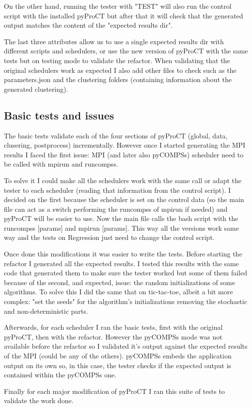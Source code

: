 On the other hand, running the tester with "TEST" will also run the control script with the installed pyProCT but after that it will check that the generated output matches the content of the "expected results dir".

The last three attributes allow us to use a single expected results dir with different scripts and schedulers, or use the new version of pyProCT with the same tests but on testing mode to validate the refactor. When validating that the original schedulers work as expected I also add other files to check such as the parameters.json and the clustering folders (containing information about the generated clustering).

\subsection{Basic tests and issues}

The basic tests validate each of the four sections of pyProCT (global, data, clusering, postprocess) incrementally. However once I started generating the MPI results I faced the first issue: MPI (and later also pyCOMPSs) scheduler need to be called with mpirun and runcompss. 

To solve it I could make all the schedulers work with the same call or adapt the tester to each scheduler (reading that information from the control script). I decided on the first because the scheduler is set on the control data (so the main file can act as a switch performing the runcompss of mpirun if needed) and pyProCT will be easier to use. Now the main file calls the bash script with the runcompss [params] and mpirun [params]. This way all the versions work same way and the tests on Regression just need to change the control script.

Once done this modifications it was easier to write the tests. Before starting the refactor I generated all the expected results. I tested this results with the same code that generated them to make sure the tester worked but some of them failed because of the second, and expected, issue: the random initializations of some algorithms. To solve this I did the same that on tic-tac-toe, albeit a bit more complex: "set the seeds" for the algorithm's initializations removing the stochastic and non-deterministic parts.


Afterwards, for each scheduler I ran the basic tests, first with the original pyProCT, then with the refactor. However the pyCOMPSs mode was not available before the refactor so I validated it's output against the expected results of the MPI (could be any of the others). pyCOMPSs embeds the application output on its own so, in this case, the tester checks if the expected output is contained within the pyCOMPSs one.

Finally for each major modification of pyProCT I ran this suite of tests to validate the work done.
